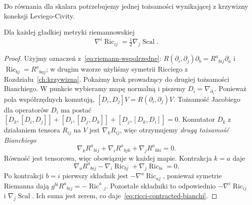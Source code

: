 Do równania dla skalara potrzebujemy jednej tożsamości
wynikającej z krzywizny koneksji Leviego-Civity.

\begin{lemat}
\label{lem:ricci-contracted-bianchi}
Dla każdej gładkiej metryki riemannowskiej
\begin{equation}\label{eq:ricci-contracted-bianchi}
 \nabla^i\operatorname{Ric}_{ij}
       =\tfrac12\nabla_j\operatorname{Scal}.
\end{equation}
\end{lemat}
\begin{proof}
Użyjmy oznaczeń z~\eqref{eq:riemann-wspolrzedne}:
$R(\partial_i,\partial_j)\partial_b
=R^a{}_{b i j}\partial_a$ i
$\operatorname{Ric}_{bj}=R^a{}_{b a j}$; w drugim
wzorze użyliśmy symetrii Ricciego z
Rozdziału~\ref{ch:krzywizna}. Pokażmy krok prowadzący
do drugiej tożsamości Bianchiego. W punkcie wybieramy
mapę normalną i piszemy $D_i=\nabla_{\partial_i}$.
Ponieważ pola współrzędnych komutują,
$[D_i,D_j]V=R(\partial_i,\partial_j)V$.
Tożsamość Jacobiego dla operatorów $D_i$ ma postać
$[D_k,[D_i,D_j]]+[D_i,[D_j,D_k]]+[D_j,[D_k,D_i]]=0$.
Komutator $D_k$ z działaniem tensora $R_{ij}$
na $V$ jest $\nabla_kR_{ij}$, więc otrzymujemy
\emph{drugą tożsamość Bianchiego}
\[
 \nabla_kR^a{}_{b i j}
 +\nabla_iR^a{}_{b j k}
 +\nabla_jR^a{}_{b k i}=0.
\]
Równość jest tensorowa, więc obowiązuje w każdej
mapie. Kontrakcja $k=a$ daje
\[
 \nabla_aR^a{}_{b i j}
 -\nabla_i\operatorname{Ric}_{bj}
 +\nabla_j\operatorname{Ric}_{bi}=0.
\]
Po kontrakcji $b=i$ pierwszy składnik jest
$-\nabla^a\operatorname{Ric}_{aj}$, ponieważ symetrie
Riemanna dają $g^{bi}R^a{}_{b i j}
=-\operatorname{Ric}^a{}_j$.
Pozostałe składniki to odpowiednio
$-\nabla^i\operatorname{Ric}_{ij}$ i
$\nabla_j\operatorname{Scal}$. Ich suma jest zerem,
co daje~\eqref{eq:ricci-contracted-bianchi}.
\end{proof}

